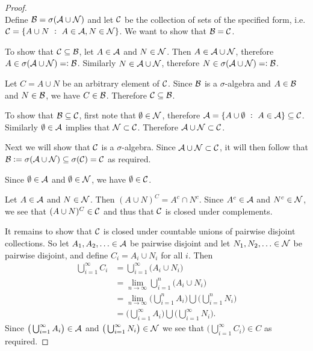 \begin{proof}~\\
  Define $\mathcal B = \sigma(\mathcal A \cup \mathcal N)$ and let $\mathcal C$ be the collection of sets of the specified form,
  i.e. $\mathcal C = \{A \cup N ~:~ A \in \mathcal A, N \in \mathcal N\}$. We want to show that $\mathcal B = \mathcal C$.

  To show that $\mathcal C \subseteq \mathcal B$, let $A \in \mathcal A$ and $N \in \mathcal N$. Then $A \in \mathcal A \cup \mathcal N$,
  therefore $A \in \sigma(\mathcal A \cup \mathcal N) =: \mathcal B$. Similarly $N \in \mathcal A \cup \mathcal N$,
  therefore $N \in \sigma(\mathcal A \cup \mathcal N) =: \mathcal B$.

  Let $C = A \cup N$ be an arbitrary element of $\mathcal C$. Since $\mathcal B$ is a $\sigma$-algebra and $A \in \mathcal B$
  and $N \in \mathcal B$, we have $C \in \mathcal B$. Therefore $\mathcal C \subseteq \mathcal B$.

  To show that $\mathcal B \subseteq \mathcal C$, first note that $\emptyset \in \mathcal N$,
  therefore $\mathcal A = \{ A \cup \emptyset ~:~ A \in \mathcal A \} \subseteq \mathcal C$. Similarly $\emptyset \in \mathcal A$
  implies that $\mathcal N \subset \mathcal C$. Therefore $\mathcal A \cup \mathcal N \subset \mathcal C$.

  Next we will show that $\mathcal C$ is a $\sigma$-algebra. Since $\mathcal A \cup \mathcal N \subset \mathcal C$, it will then
  follow that $\mathcal B := \sigma(\mathcal A \cup \mathcal N) \subseteq \sigma(\mathcal C) = \mathcal C$ as required.

  Since $\emptyset \in \mathcal A$ and $\emptyset \in \mathcal N$, we have $\emptyset \in \mathcal C$.

  Let $A \in \mathcal A$ and $N \in \mathcal N$. Then $(A \cup N)^C = A^c \cap N^c$. Since $A^c \in \mathcal A$
  and $N^c \in \mathcal N$, we see that $(A \cup N)^C \in \mathcal C$ and thus that $\mathcal C$ is closed under complements.

  It remains to show that $\mathcal C$ is closed under countable unions of pairwise disjoint collections. So
  let $A_1, A_2, \ldots \in \mathcal A$ be pairwise disjoint and let $N_1, N_2, \ldots \in \mathcal N$ be pairwise
  disjoint, and define $C_i = A_i \cup N_i$ for all $i$. Then
  \begin{align*}
    \bigcup_{i=1}^\infty C_i
    &= \bigcup_{i=1}^\infty \big(A_i \cup N_i\big) \\
    &= \lim_{n\to\infty} \bigcup_{i=1}^n \big(A_i \cup N_i\big) \\
    &= \lim_{n\to\infty} \big(\bigcup_{i=1}^n A_i\big) \bigcup \big(\bigcup_{i=1}^n N_i \big) \\
    &= \big(\bigcup_{i=1}^\infty A_i\big) \bigcup \big(\bigcup_{i=1}^\infty N_i \big).
  \end{align*}
  Since $\big(\bigcup_{i=1}^\infty A_i\big) \in \mathcal A$ and $\big(\bigcup_{i=1}^\infty N_i\big) \in \mathcal N$ we see that $\big(\bigcup_{i=1}^\infty C_i\big) \in C$ as required.
\end{proof}


